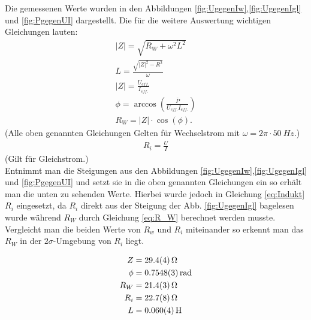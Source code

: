Die gemessenen Werte wurden in den Abbildungen \ref{fig:UgegenIw},\ref{fig:UgegenIgl} und \ref{fig:PgegenUI} dargestellt.
Die für die weitere Auswertung wichtigen Gleichungen lauten:
\begin{align}
	|Z|=\sqrt{R_W + \omega^2L^2}\\
	L=\frac{\sqrt{|Z|^2-R^2}}{\omega}\\
	\label{eq:Indukt}
	|Z|=\frac{U_{eff.}}{I_{eff.}}\\
	\phi = \arccos\left(\frac{\bar{P}}{U_{eff.}I_{eff.}}\right)\\
	R_W=|Z|\cdot \cos(\phi)	\label{eq:R_W}.
\end{align}
(Alle oben genannten Gleichungen Gelten für Wechselstrom mit $\omega=2\pi \cdot \SI{50}{Hz}.$)
\begin{align}
	R_i=\frac{U}{I}
\end{align}
(Gilt für Gleichstrom.)\\
Entnimmt man die Steigungen aus den Abbildungen \ref{fig:UgegenIw},\ref{fig:UgegenIgl} und \ref{fig:PgegenUI} und setzt sie in die oben genannten Gleichungen ein so erhält man die unten zu sehenden Werte. Hierbei wurde jedoch in Gleichung \ref{eq:Indukt} $R_i$ eingesetzt, da $R_i$ direkt aus der Steigung der Abb. \ref{fig:UgegenIgl} bagelesen wurde während $R_W$ durch Gleichung \ref{eq:R_W} berechnet werden musste. Vergleicht man die beiden Werte von $R_w$ und $R_i$ miteinander so erkennt man das  $R_W$ in der $2\sigma$-Umgebung von $R_i$ liegt. 

\begin{align}
		Z &= \SI{29.4+-0.4}{\ohm}\\
		\phi &= \SI{0.7548+-0.0003}{rad}\\
		R_W &= \SI{21.4+-0.3}{\ohm}\\
		R_i &= \SI{22.7+-0.8}{\ohm}\\
		L &= \SI{0,060+-0,004}{H}\\
\end{align}
